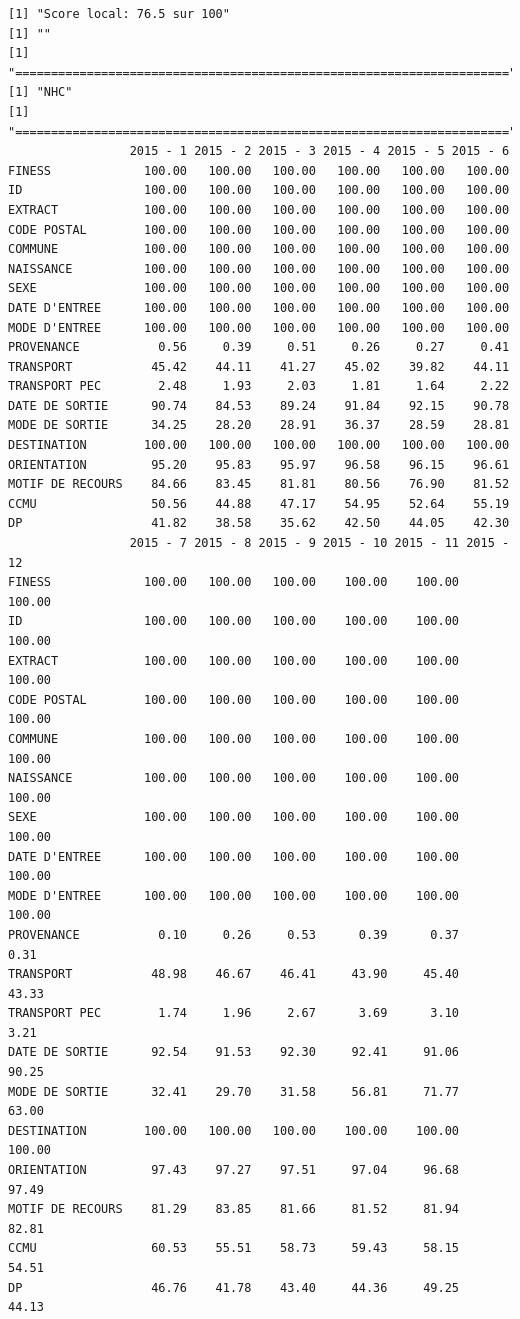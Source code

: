 \documentclass[]{article}
\begin{document}
\begin{verbatim}
[1] "Score local: 76.5 sur 100"
[1] ""
[1] "====================================================================="
[1] "NHC"
[1] "====================================================================="
                 2015 - 1 2015 - 2 2015 - 3 2015 - 4 2015 - 5 2015 - 6
FINESS             100.00   100.00   100.00   100.00   100.00   100.00
ID                 100.00   100.00   100.00   100.00   100.00   100.00
EXTRACT            100.00   100.00   100.00   100.00   100.00   100.00
CODE POSTAL        100.00   100.00   100.00   100.00   100.00   100.00
COMMUNE            100.00   100.00   100.00   100.00   100.00   100.00
NAISSANCE          100.00   100.00   100.00   100.00   100.00   100.00
SEXE               100.00   100.00   100.00   100.00   100.00   100.00
DATE D'ENTREE      100.00   100.00   100.00   100.00   100.00   100.00
MODE D'ENTREE      100.00   100.00   100.00   100.00   100.00   100.00
PROVENANCE           0.56     0.39     0.51     0.26     0.27     0.41
TRANSPORT           45.42    44.11    41.27    45.02    39.82    44.11
TRANSPORT PEC        2.48     1.93     2.03     1.81     1.64     2.22
DATE DE SORTIE      90.74    84.53    89.24    91.84    92.15    90.78
MODE DE SORTIE      34.25    28.20    28.91    36.37    28.59    28.81
DESTINATION        100.00   100.00   100.00   100.00   100.00   100.00
ORIENTATION         95.20    95.83    95.97    96.58    96.15    96.61
MOTIF DE RECOURS    84.66    83.45    81.81    80.56    76.90    81.52
CCMU                50.56    44.88    47.17    54.95    52.64    55.19
DP                  41.82    38.58    35.62    42.50    44.05    42.30
                 2015 - 7 2015 - 8 2015 - 9 2015 - 10 2015 - 11 2015 - 12
FINESS             100.00   100.00   100.00    100.00    100.00    100.00
ID                 100.00   100.00   100.00    100.00    100.00    100.00
EXTRACT            100.00   100.00   100.00    100.00    100.00    100.00
CODE POSTAL        100.00   100.00   100.00    100.00    100.00    100.00
COMMUNE            100.00   100.00   100.00    100.00    100.00    100.00
NAISSANCE          100.00   100.00   100.00    100.00    100.00    100.00
SEXE               100.00   100.00   100.00    100.00    100.00    100.00
DATE D'ENTREE      100.00   100.00   100.00    100.00    100.00    100.00
MODE D'ENTREE      100.00   100.00   100.00    100.00    100.00    100.00
PROVENANCE           0.10     0.26     0.53      0.39      0.37      0.31
TRANSPORT           48.98    46.67    46.41     43.90     45.40     43.33
TRANSPORT PEC        1.74     1.96     2.67      3.69      3.10      3.21
DATE DE SORTIE      92.54    91.53    92.30     92.41     91.06     90.25
MODE DE SORTIE      32.41    29.70    31.58     56.81     71.77     63.00
DESTINATION        100.00   100.00   100.00    100.00    100.00    100.00
ORIENTATION         97.43    97.27    97.51     97.04     96.68     97.49
MOTIF DE RECOURS    81.29    83.85    81.66     81.52     81.94     82.81
CCMU                60.53    55.51    58.73     59.43     58.15     54.51
DP                  46.76    41.78    43.40     44.36     49.25     44.13
\end{verbatim}
\end{document}
